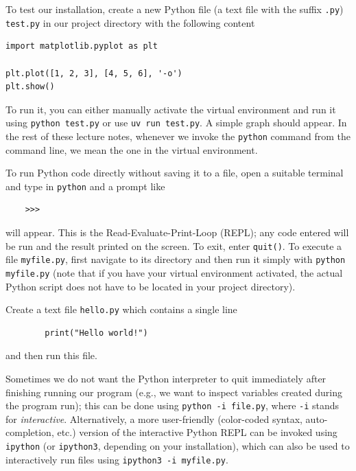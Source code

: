To test our installation, create a new Python file (a text file with the suffix \verb|.py|) \verb|test.py| in our project directory with the following content
\begin{lstlisting}
import matplotlib.pyplot as plt

plt.plot([1, 2, 3], [4, 5, 6], '-o')
plt.show()
\end{lstlisting}
To run it, you can either manually activate the virtual environment and run it using \verb|python test.py| or use \verb|uv run test.py|. A simple graph should appear. In the rest of these lecture notes, whenever we invoke the \verb|python| command from the command line, we mean the one in the virtual environment.

To run Python code directly without saving it to a file, open a suitable terminal and type in \verb|python| and a prompt like
\begin{lstlisting}
    >>>
\end{lstlisting}
will appear. This is the Read-Evaluate-Print-Loop (REPL); any code entered will be run and the result printed on the screen. To exit, enter \verb|quit()|. To execute a file \verb|myfile.py|, first navigate to its directory and then run it simply with \verb|python myfile.py| (note that if you have your virtual environment activated, the actual Python script does not have to be located in your project directory).

\begin{exercise}
    Create a text file \verb|hello.py| which contains a single line
    \begin{lstlisting}
        print("Hello world!")
    \end{lstlisting}
    and then run this file.
\end{exercise}

Sometimes we do not want the Python interpreter to quit immediately after finishing running our program (e.g., we want to inspect variables created during the program run); this can be done using \verb|python -i file.py|, where \verb|-i| stands for \emph{interactive}. Alternatively, a more user-friendly (color-coded syntax, auto-completion, etc.) version of the interactive Python REPL can be invoked using \verb|ipython| (or \verb|ipython3|, depending on your installation), which can also be used to interactively run files using \verb|ipython3 -i myfile.py|.

